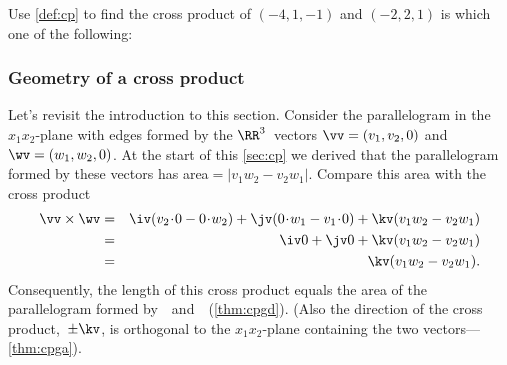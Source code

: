 \begin{activity} 
Use \autoref{def:cp} to find the cross product of \((-4,1,-1)\) and \((-2,2,1)\) is which one of the following:
\end{activity}




\subsubsection{Geometry of a cross product}


\begin{example} \label{eg:cppara}
Let's revisit the introduction to this section.
Consider the parallelogram in the \(x_1x_2\)-plane with edges formed by the \(\RR^3\)~vectors \(\vv=(v_1,v_2,0)\) and \(\wv=(w_1,w_2,0)\).
At the start of this \autoref{sec:cp} we derived that the parallelogram formed by these vectors has area\({}=|v_1w_2-v_2w_1|\).
Compare this area with the cross product
\begin{eqnarray*}
\vv\times\wv&=&\iv(v_2\cdot0-0\cdot w_2)
+\jv(0\cdot w_1-v_1\cdot0)
+\kv(v_1w_2-v_2w_1)
\\&=&\iv0+\jv0+\kv(v_1w_2-v_2w_1)
\\&=&\kv(v_1w_2-v_2w_1).
\end{eqnarray*}
Consequently, the length of this cross product equals the area of the parallelogram formed by~\vv\ and~\wv\ (\autoref{thm:cpgd}).
(Also the direction of the cross product,~\(\pm\kv\), is orthogonal to the \(x_1x_2\)-plane containing the two vectors---\autoref{thm:cpga}).
\end{example}



